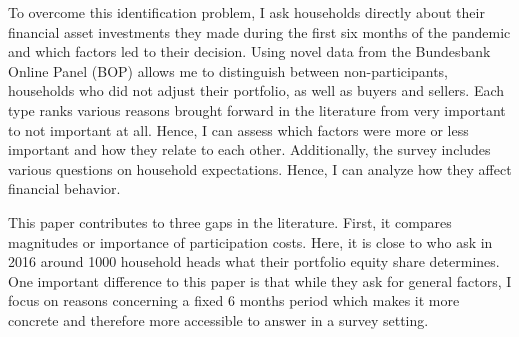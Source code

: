 \documentclass[ProjectABM]{subfiles}
\begin{document}
 To overcome this identification problem, I ask households directly about their financial asset investments they made during the first six months of the pandemic and which factors led to their decision. 
 Using novel data from the Bundesbank Online Panel (BOP) allows me to distinguish between non-participants, households who did not adjust their portfolio, as well as buyers and sellers. Each type ranks various reasons brought forward in the literature from very important to not important at all. Hence, I can assess which factors were more or less important and how they relate to each other. 
 Additionally, the survey includes various questions on household expectations. Hence, I can analyze how they affect financial behavior.



This paper contributes to three gaps in the literature. First, it compares magnitudes or importance of participation costs. Here, it is close to \cite{choi_2020} who ask in 2016 around 1000 household heads what their portfolio equity share determines. One important difference to this paper is that while they ask for general factors, I focus on reasons concerning a fixed 6 months period which makes it more concrete and therefore more accessible to answer in a survey setting. %
\end{document}
